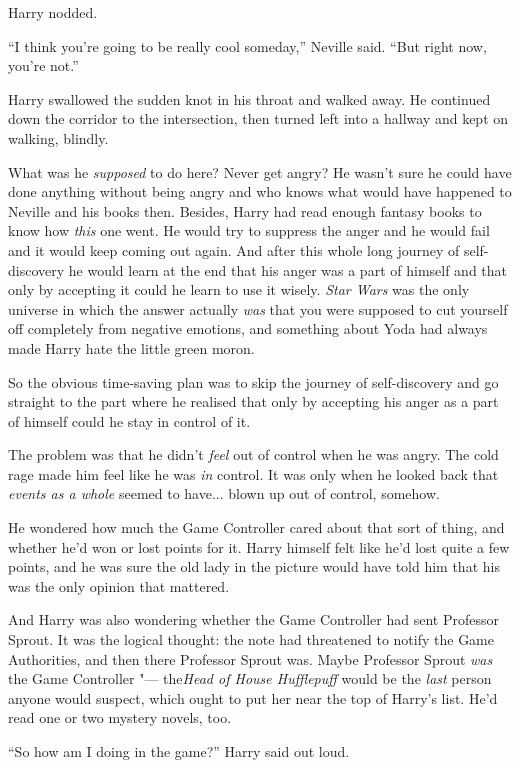 Harry nodded.

``I think you're going to be really cool someday,'' Neville said. ``But
right now, you're not.''

Harry swallowed the sudden knot in his throat and walked away. He
continued down the corridor to the intersection, then turned left into a
hallway and kept on walking, blindly.

What was he \emph{supposed} to do here? Never get angry? He wasn't sure
he could have done anything without being angry and who knows what would
have happened to Neville and his books then. Besides, Harry had read
enough fantasy books to know how \emph{this} one went. He would try to
suppress the anger and he would fail and it would keep coming out again.
And after this whole long journey of self-discovery he would learn at
the end that his anger was a part of himself and that only by accepting
it could he learn to use it wisely. \emph{Star Wars} was the only
universe in which the answer actually \emph{was} that you were supposed
to cut yourself off completely from negative emotions, and something
about Yoda had always made Harry hate the little green moron.

So the obvious time-saving plan was to skip the journey of
self-discovery and go straight to the part where he realised that only
by accepting his anger as a part of himself could he stay in control of
it.

The problem was that he didn't \emph{feel} out of control when he was
angry. The cold rage made him feel like he was \emph{in} control. It was
only when he looked back that \emph{events as a whole} seemed to
have... blown up out of control, somehow.

He wondered how much the Game Controller cared about that sort of thing,
and whether he'd won or lost points for it. Harry himself felt like he'd
lost quite a few points, and he was sure the old lady in the picture
would have told him that his was the only opinion that mattered.

And Harry was also wondering whether the Game Controller had sent
Professor Sprout. It was the logical thought: the note had threatened to
notify the Game Authorities, and then there Professor Sprout was. Maybe
Professor Sprout \emph{was} the Game Controller "--- the\emph{Head of House
Hufflepuff} would be the \emph{last} person anyone would suspect, which
ought to put her near the top of Harry's list. He'd read one or two
mystery novels, too.

``So how am I doing in the game?'' Harry said out loud.

